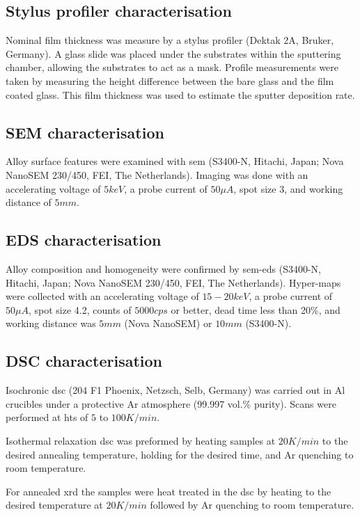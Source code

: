 \documentclass[a4paper,12pt,oneside]{report}%
\begin{document}
\subsection{Stylus profiler characterisation}
Nominal film thickness was measure by a stylus profiler (Dektak 2A, Bruker, Germany). A glass slide was placed under the substrates within the sputtering chamber, allowing the substrates to act as a mask. Profile measurements were taken by measuring the height difference between the bare glass and the film coated glass. This film thickness was used to estimate the sputter deposition rate.  

\subsection{SEM characterisation}
Alloy surface features were examined with \gls{sem} (S3400-N, Hitachi, Japan; Nova NanoSEM 230/450, FEI, The Netherlands). Imaging was done with an accelerating voltage of $5keV$, a probe current of $50 \mu A$, spot size 3, and working distance of $5mm$.

\subsection{EDS characterisation}
Alloy composition and homogeneity were confirmed by \acrshort{sem}-\acrshort{eds} (S3400-N, Hitachi, Japan; Nova NanoSEM 230/450, FEI, The Netherlands). Hyper-maps were collected with an accelerating voltage of $15-20keV$, a probe current of $50 \mu A$, spot size 4.2, counts of $5000cps$ or better, dead time less than 20\%, and working distance was $5mm$ (Nova NanoSEM) or $10mm$ (S3400-N).

\subsection{DSC characterisation}
Isochronic \acrshort{dsc} (204 F1 Phoenix, Netzsch, Selb, Germany) was carried out in Al crucibles under a protective Ar atmosphere (99.997 vol.\% purity). Scans were performed at \glspl{ht} of $5$ to $100 K/min$. 

Isothermal relaxation \acrshort{dsc} was preformed by heating samples at $20 K/min$ to the desired annealing temperature, holding for the desired time, and Ar quenching to room temperature.

For annealed \acrshort{xrd} the samples were heat treated in the \acrshort{dsc} by heating to the desired temperature at $20 K/min$ followed by Ar quenching to room temperature.
\end{document}
